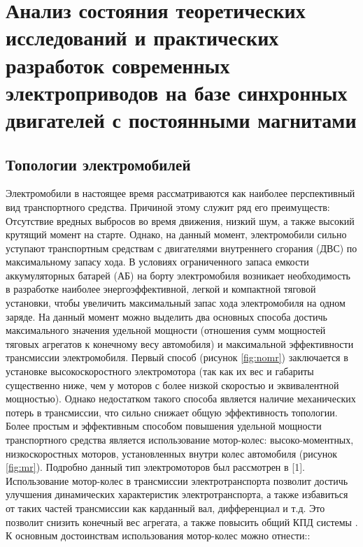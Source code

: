 \chapter{Анализ состояния теоретических исследований и практических разработок современных электроприводов на базе синхронных двигателей с постоянными магнитами } \label{ch:ch1}

\section{Топологии электромобилей} \label{sec:ch1/sec1}

Электромобили в настоящее время рассматриваются как наиболее перспективный вид транспортного средства. Причиной этому служит ряд его преимуществ: Отсутствие вредных выбросов во время движения, низкий шум, а также высокий крутящий момент на старте. Однако, на данный момент, электромобили сильно уступают транспортным средствам с двигателями внутреннего сгорания (ДВС) по максимальному запасу хода. В условиях ограниченного запаса емкости аккумуляторных батарей (АБ) на борту электромобиля возникает необходимость в разработке наиболее энергоэффективной, легкой и компактной тяговой установки, чтобы увеличить максимальный запас хода электромобиля на одном заряде. 
На данный момент можно выделить два основных способа достичь максимального значения удельной мощности (отношения сумм мощностей тяговых агрегатов к конечному весу автомобиля) и максимальной эффективности трансмиссии электромобиля. Первый способ (рисунок \ref{fig:nomr}) заключается в установке высокоскоростного электромотора (так как их вес и габариты существенно ниже, чем у моторов с более низкой скоростью и эквивалентной мощностью). Однако недостатком такого способа является наличие механических потерь в трансмиссии, что сильно снижает общую эффективность топологии.
Более простым и эффективным способом повышения удельной мощности транспортного средства является использование мотор-колес: высоко-моментных, низкоскоростных моторов, установленных внутри колес автомобиля (рисунок \ref{fig:mr}). Подробно данный тип электромоторов был рассмотрен в \cite{1Luque}[1]. Использование мотор-колес в трансмиссии электротранспорта позволит достичь улучшения динамических характеристик электротранспорта, а также избавиться от таких частей трансмиссии как карданный вал, дифференциал и т.д. Это позволит снизить конечный вес агрегата, а также повысить общий КПД системы \cite{2KingJetTseng,3Lovatt}.
\noindent К основным достоинствам использования мотор-колес можно отнести::
